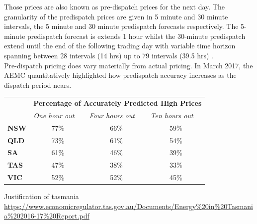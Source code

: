 Those prices are also known as pre-dispatch prices for the next day. The granularity of the predispatch prices are given in 5 minute and 30 minute intervals, the 5 minute and 30 minute predispatch forecasts respectively. The 5-minute predispatch forecast is extends 1 hour whilst the 30-minute predispatch extend until the end of the following trading day with variable time horizon spanning between 28 intervals (14 hrs) up to 79 intervals (39.5 hrs)
\parencite{Predispatch}. \\
Pre-dispatch pricing does vary materially from actual pricing. In March 2017, the AEMC quantitatively highlighted how predispatch accuracy increases as the dispatch period nears.
\begin{table}[!h]
\begin{tabular}{l|c|c|c|}
\cline{2-4}
                                   & \multicolumn{3}{l|}{\cellcolor[HTML]{EFEFEF}\textbf{Percentage of Accurately Predicted High Prices}}                                    \\ \cline{2-4} 
                                   & \multicolumn{1}{l|}{\textit{One hour out}} & \multicolumn{1}{l|}{\textit{Four hours out}} & \multicolumn{1}{l|}{\textit{Ten hours out}} \\ \hline
\multicolumn{1}{|l|}{\textbf{NSW}} & 77\%                                       & 66\%                                         & 59\%                                        \\ \hline
\multicolumn{1}{|l|}{\textbf{QLD}} & 73\%                                       & 61\%                                         & 54\%                                        \\ \hline
\multicolumn{1}{|l|}{\textbf{SA}}  & 61\%                                       & 46\%                                         & 39\%                                        \\ \hline
\multicolumn{1}{|l|}{\textbf{TAS}} & 47\%                                       & 38\%                                         & 33\%                                        \\ \hline
\multicolumn{1}{|l|}{\textbf{VIC}} & 52\%                                       & 52\%                                         & 45\%                                        \\ \hline
\end{tabular}
\end{table}
Justification of tasmania \url{https://www.economicregulator.tas.gov.au/Documents/Energy%20in%20Tasmania%202016-17%20Report.pdf }

